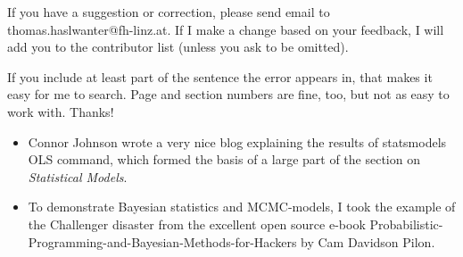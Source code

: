 If you have a suggestion or correction, please send email to
thomas.haslwanter@fh-linz.at. If I make a change based on your feedback,
I will add you to the contributor list (unless you ask to be omitted).

If you include at least part of the sentence the error appears in, that
makes it easy for me to search. Page and section numbers are fine, too,
but not as easy to work with. Thanks!

\begin{itemize}
  \item Connor Johnson wrote a very nice blog explaining the results of
  statsmodels OLS command, which formed the basis of a large part of the
  section on \emph{Statistical Models}.
  
  \item To demonstrate Bayesian statistics and MCMC-models, I took the example of the Challenger disaster from the excellent open source e-book Probabilistic-Programming-and-Bayesian-Methods-for-Hackers by Cam Davidson Pilon.
\end{itemize}
